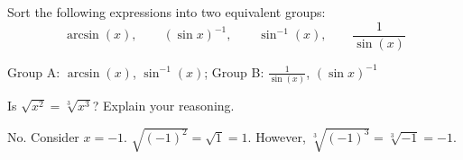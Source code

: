 \begin{exercises}
\begin{exercise}
Sort the following expressions into two equivalent groups:
\[
\arcsin(x), \qquad (\sin x)^{-1}, \qquad  \sin^{-1}(x), \qquad \frac{1}{\sin(x)} 
\]
\begin{answer}
Group A: $\arcsin(x)$, $\sin^{-1}(x)$;
Group B: $\frac{1}{\sin(x)}$, $(\sin x)^{-1}$
\end{answer}
\end{exercise}

\begin{exercise} 
Is $\sqrt{x^2} = \sqrt[3]{x^3}$? Explain your reasoning.
\begin{answer}
No. Consider $x = -1$. $\sqrt{(-1)^2} = \sqrt{1} = 1$. However, $\sqrt[3]{(-1)^3} =  \sqrt[3]{-1} = -1$.  
\end{answer}
\end{exercise}



\end{exercises}
